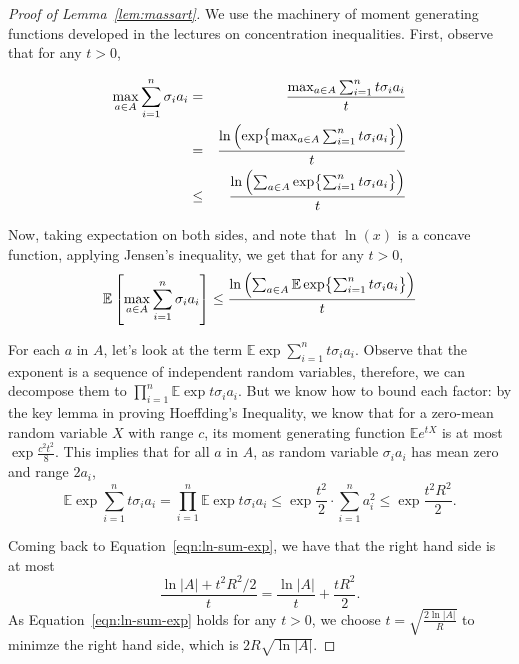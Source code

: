 \documentclass{article}
\newcommand{\EE}{\mathbb{E}}
\begin{document}
\begin{proof}[Proof of Lemma~\ref{lem:massart}]
We use the machinery of moment generating functions developed in the lectures on concentration inequalities.
First, observe that for any $t > 0$,

\begin{eqnarray*}
\max_{a \in A} \sum_{i=1}^n \sigma_i a_i
&=& \frac{\max_{a \in A} \sum_{i=1}^n t \sigma_i a_i}{t} \\
&=& \frac{\ln\del{\exp{\max_{a \in A} \sum_{i=1}^n t \sigma_i a_i}}}{t} \\
&\leq& \frac{\ln\del{\sum_{a \in A} \exp{\sum_{i=1}^n t \sigma_i a_i}}}{t} \\
\end{eqnarray*}

Now, taking expectation on both sides, and note that $\ln(x)$ is a concave function,
applying Jensen's inequality, we get that for any $t > 0$,
\begin{equation}
  \EE \sbr{\max_{a \in A} \sum_{i=1}^n \sigma_i a_i}
   \leq \frac{\ln\del{\sum_{a \in A} \EE \exp{\sum_{i=1}^n t \sigma_i a_i}}}{t}
   \label{eqn:ln-sum-exp}
\end{equation}

For each $a$ in $A$, let's look at the term $\EE \exp{\sum_{i=1}^n t \sigma_i a_i}$. Observe
that the exponent is a sequence of independent random variables, therefore, we can decompose them to $\prod_{i=1}^n \EE \exp{t \sigma_i a_i}$. But we know how to bound each factor: by the key lemma in proving Hoeffding's Inequality, we know that for a zero-mean random variable $X$ with range $c$, its moment generating function $\EE e^{t X}$ is at most $\exp{ \frac{c^2 t^2}{8}}$. This implies that for all $a$ in $A$, as random variable $\sigma_i a_i$ has mean zero and range $2a_i$,
\[ \EE \exp{\sum_{i=1}^n t \sigma_i a_i}
    = \prod_{i=1}^n \EE \exp{t \sigma_i a_i}
    \leq \exp{\frac{t^2}{2} \cdot \sum_{i=1}^n a_i^2} \leq \exp{\frac{t^2 R^2}{2}}. \]

Coming back to Equation~\eqref{eqn:ln-sum-exp}, we have that the right hand side is at most
\[ \frac{\ln|A| + t^2 R^2/2}{t} = \frac{\ln|A|}{t} + \frac{t R^2}{2}. \]
As Equation~\eqref{eqn:ln-sum-exp} holds for any $t > 0$, we choose
$t = \sqrt{\frac{2\ln|A|}{R}}$ to minimze the right hand side, which is $2 R \sqrt{\ln|A|}$.
\end{proof}

\appendix
\end{document}
